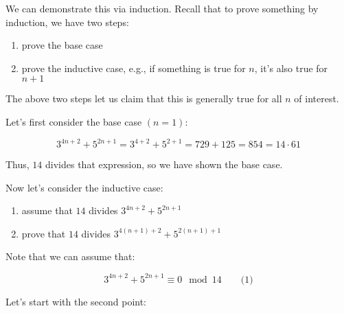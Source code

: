 We can demonstrate this via induction. Recall that to prove something by
induction, we have two steps:

\begin{enumerate}
\item prove the base case
\item prove the inductive case, e.g., if something is true for $n$, it's also
      true for $n+1$
\end{enumerate}

The above two steps let us claim that this is generally true for all $n$ of
interest.

Let's first consider the base case $(n = 1)$:

$$
  3^{4n + 2} + 5^{2n + 1} = 3^{4 + 2} + 5^{2 + 1} = 729 + 125 = 854 = 14 \cdot 61
$$

Thus, $14$ divides that expression, so we have shown the base case.

Now let's consider the inductive case:

\begin{enumerate}
\item assume that $14$ divides $3^{4n + 2} + 5^{2n + 1}$
\item prove that $14$ divides $3^{4(n+1) + 2} + 5^{2(n+1) + 1}$
\end{enumerate}

Note that we can assume that:

$$
  3^{4n + 2} + 5^{2n + 1} \equiv 0 \mod 14 \qquad \text{(1)}
$$

Let's start with the second point:

